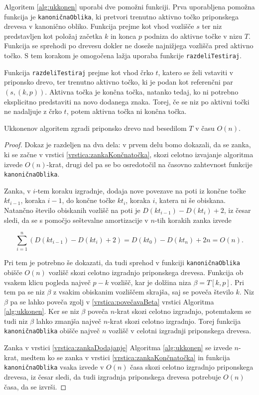 Algoritem \ref{alg:ukkonen} uporabi dve pomožni funkciji. Prva uporabljena pomožna funkcija je \texttt{kanoničnaOblika}, ki pretvori trenutno aktivno točko priponskega drevesa v kanonično obliko. Funkcija prejme kot vhod vozlišče $s$ ter niz predstavljen kot položaj začetka $k$ in konca $p$ podniza do aktivne točke v nizu $T$. Funkcija se sprehodi po drevesu dokler ne doseže najnižjega vozlišča pred aktivno točko. S tem korakom je omogočena lažja uporaba funkcije \texttt{razdeliTestiraj}.

Funkcija \texttt{razdeliTestiraj} prejme kot vhod črko $t$, katero se želi vstaviti v priponsko drevo, ter trenutno aktivno točko, ki je podan kot referenčni par $(s,(k,p))$. Aktivna točka je končna točka, natanko tedaj, ko ni potrebno eksplicitno predstaviti na novo dodanega znaka. Torej, če se niz po aktivni točki ne nadaljuje z črko $t$, potem aktivna točka ni končna točka.


\begin{izr} \label{izr:ukkonen}
    Ukkonenov algoritem zgradi priponsko drevo nad besedilom $T$ v času $O(n)$.
\end{izr}


\begin{proof}

Dokaz je razdeljen na dva dela: v prvem delu bomo dokazali, da se zanka, ki se začne v vrstici \ref{vrstica:zankaKončnatočka}, skozi celotno izvajanje algoritma izvede $O(n)$-krat, drugi del pa se bo osredotočil na časovno zahtevnost funkcije \texttt{kanoničnaOblika}.

Zanka, v $i$-tem koraku izgradnje, dodaja nove povezave na poti iz končne točke $kt_{i-1}$, koraka $i-1$, do končne točke $kt_i$, koraka $i$, katera ni še obiskana. Natančno število obiskanih vozlišč na poti je $D(kt_{i-1})-D(kt_i)+2$, iz česar sledi, da se s pomočjo seštevalne amortizacije v $n$-tih korakih zanka izvede


$$
    \sum_{i=1}^n \left(D(kt_{i-1})-D(kt_i)+2\right)=D(kt_0)-D(kt_n)+2n=O(n).
$$

Pri tem je potrebno še dokazati, da tudi sprehod v funkciji \texttt{kanoničnaOblika} obišče $O(n)$ vozlišč skozi celotno izgradnjo priponskega drevesa. Funkcija ob vsakem klicu pogleda največ $p-k$ vozlišč, kar je dolžina niza $\beta=T[k,p]$. Pri tem pa se niz $\beta$ z vsakim obiskanim vozliščem skrajša, saj se poveča število $k$. Niz $\beta$ pa se lahko poveča zgolj v \ref{vrstica:povečavaBeta} vrstici Algoritma \ref{alg:ukkonen}. Ker se niz $\beta$ poveča $n$-krat skozi celotno izgradnjo, potemtakem se tudi niz $\beta$ lahko zmanjša največ $n$-krat skozi celotno izgradnjo. Torej funkcija \texttt{kanoničnaOblika} obišče največ $n$ vozlišč v celotni izgradnji priponskega drevesa.


Zanka v vrstici \ref{vrstica:zankaDodajanje} Algoritma \ref{alg:ukkonen} se izvede $n$-krat, medtem ko se zanka v vrstici \ref{vrstica:zankaKončnatočka} in funkcija \texttt{kanoničnaOblika} vsaka izvede v $O(n)$ časa skozi celotno izgradnjo priponskega drevesa, iz česar sledi, da tudi izgradnja priponskega drevesa potrebuje $O(n)$ časa, da se izvrši.
  
\end{proof}

